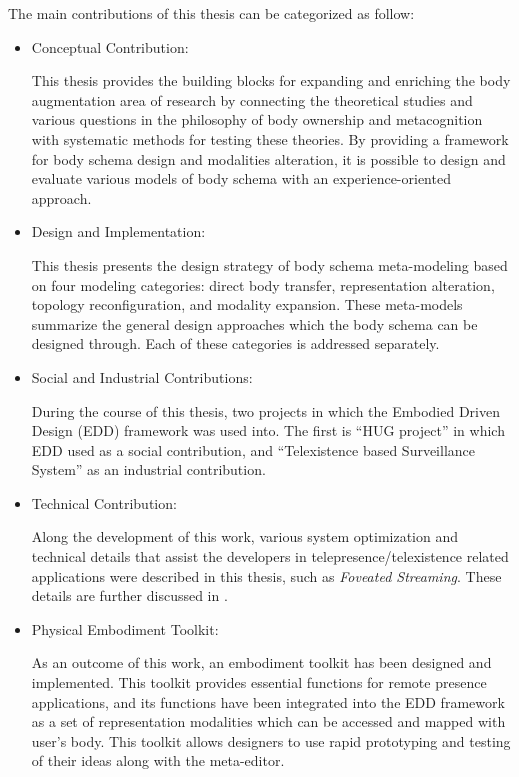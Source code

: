 The main contributions of this thesis can be categorized as follow:
\begin{itemize}

\item Conceptual Contribution: 

This thesis provides the building blocks for expanding and enriching the body augmentation area of research by connecting the theoretical studies and various questions in the philosophy of body ownership and metacognition with systematic methods for testing these theories. By providing a framework for body schema design and modalities alteration, it is possible to design and evaluate various models of body schema with an experience-oriented approach.

\item Design and Implementation:

This thesis presents the design strategy of body schema meta-modeling based on four modeling categories: direct body transfer, representation alteration, topology reconfiguration, and modality expansion. These meta-models summarize the general design approaches which the body schema can be designed through. Each of these categories is addressed separately.

\item Social and Industrial Contributions:

During the course of this thesis, two projects in which the Embodied Driven Design (EDD) framework was used into. The first is ``HUG project'' in which EDD used as a social contribution, and ``Telexistence based Surveillance System'' as an industrial contribution.

\item Technical Contribution: 

Along the development of this work, various system optimization and technical details that assist the developers in telepresence/telexistence related applications were described in this thesis, such as \textit{Foveated Streaming}. These details are further discussed in .

\item Physical Embodiment Toolkit: 

As an outcome of this work, an embodiment toolkit has been designed and implemented. This toolkit provides essential functions for remote presence applications, and its functions have been integrated into the EDD framework as a set of representation modalities which can be accessed and mapped with user's body. This toolkit allows designers to use rapid prototyping and testing of their ideas along with the meta-editor.

\end{itemize}


